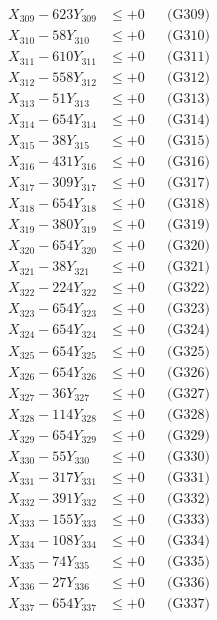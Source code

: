 \documentclass[a4paper,10pt]{article}
\begin{document}
{\begin{align}
X_{309} - 623Y_{309} &\leq +0 && \text{(G309)} \\
X_{310} - 58Y_{310} &\leq +0 && \text{(G310)} \\
\allowbreak
X_{311} - 610Y_{311} &\leq +0 && \text{(G311)} \\
X_{312} - 558Y_{312} &\leq +0 && \text{(G312)} \\
X_{313} - 51Y_{313} &\leq +0 && \text{(G313)} \\
X_{314} - 654Y_{314} &\leq +0 && \text{(G314)} \\
X_{315} - 38Y_{315} &\leq +0 && \text{(G315)} \\
X_{316} - 431Y_{316} &\leq +0 && \text{(G316)} \\
X_{317} - 309Y_{317} &\leq +0 && \text{(G317)} \\
X_{318} - 654Y_{318} &\leq +0 && \text{(G318)} \\
X_{319} - 380Y_{319} &\leq +0 && \text{(G319)} \\
X_{320} - 654Y_{320} &\leq +0 && \text{(G320)} \\
\allowbreak
X_{321} - 38Y_{321} &\leq +0 && \text{(G321)} \\
X_{322} - 224Y_{322} &\leq +0 && \text{(G322)} \\
X_{323} - 654Y_{323} &\leq +0 && \text{(G323)} \\
X_{324} - 654Y_{324} &\leq +0 && \text{(G324)} \\
X_{325} - 654Y_{325} &\leq +0 && \text{(G325)} \\
X_{326} - 654Y_{326} &\leq +0 && \text{(G326)} \\
X_{327} - 36Y_{327} &\leq +0 && \text{(G327)} \\
X_{328} - 114Y_{328} &\leq +0 && \text{(G328)} \\
X_{329} - 654Y_{329} &\leq +0 && \text{(G329)} \\
X_{330} - 55Y_{330} &\leq +0 && \text{(G330)} \\
\allowbreak
X_{331} - 317Y_{331} &\leq +0 && \text{(G331)} \\
X_{332} - 391Y_{332} &\leq +0 && \text{(G332)} \\
X_{333} - 155Y_{333} &\leq +0 && \text{(G333)} \\
X_{334} - 108Y_{334} &\leq +0 && \text{(G334)} \\
X_{335} - 74Y_{335} &\leq +0 && \text{(G335)} \\
X_{336} - 27Y_{336} &\leq +0 && \text{(G336)} \\
X_{337} - 654Y_{337} &\leq +0 && \text{(G337)} \\

\end{align}}
\end{document}
